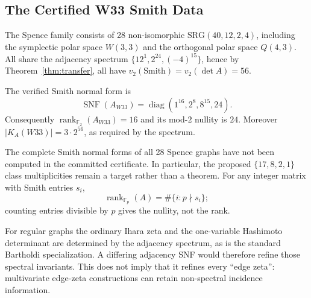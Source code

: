 \subsection{The Certified W33 Smith Data}

The Spence family consists of 28 non-isomorphic $\mathrm{SRG}(40,12,2,4)$, including
the symplectic polar space $W(3,3)$ and the orthogonal polar space $Q(4,3)$.
All share the adjacency spectrum $\{12^1, 2^{24}, (-4)^{15}\}$, hence by
Theorem~\ref{thm:transfer}, all have $v_2(\mathrm{Smith}) = v_2(\det A) = 56$.

\begin{theorem}
\label{thm:ladder}
The verified Smith normal form is
\[
 \operatorname{SNF}(A_{W33})
 =\operatorname{diag}(1^{16},2^8,8^{15},24).
\]
Consequently $\operatorname{rank}_{\mathbb F_2}(A_{W33})=16$ and its
mod-$2$ nullity is $24$. Moreover
$|K_A(W33)|=3\cdot2^{56}$, as required by the spectrum.
\end{theorem}

\begin{proposition}
\label{thm:transcend}
The complete Smith normal forms of all 28 Spence graphs have not been
computed in the committed certificate. In particular, the proposed
$\{17,8,2,1\}$ class multiplicities remain a target rather than a theorem.
For any integer matrix with Smith entries $s_i$,
\[
 \operatorname{rank}_{\mathbb F_p}(A)=\#\{i:p\nmid s_i\};
\]
counting entries divisible by $p$ gives the nullity, not the rank.
\end{proposition}

\begin{remark}
For regular graphs the ordinary Ihara zeta and the one-variable
Hashimoto determinant are determined by the adjacency spectrum, as is the
standard Bartholdi specialization. A differing adjacency SNF would therefore
refine those spectral invariants. This does not imply that it refines every
``edge zeta'': multivariate edge-zeta constructions can retain
non-spectral incidence information.
\end{remark}
